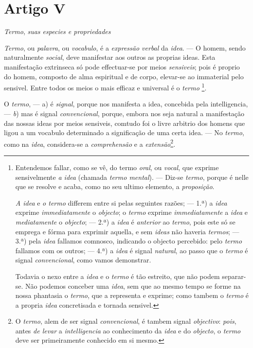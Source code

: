 
\section*{Artigo V}

  \emph{Termo}, \emph{suas especies e propriedades}


\emph{Termo}, ou \emph{palavra}, ou \emph{vocabulo}, é a \emph{expressão verbal} da \emph{idea}. --- O homem, sendo naturalmente \emph{social}, deve manifestar aos outros as proprias ideas. Esta manifestação extrinseca só pode effectuar-se por meios \emph{sensiveis}; pois é proprio do homem, composto de alma espiritual e de corpo, elevar-se ao immaterial pelo sensivel. Entre todos os meios o mais efficaz e universal é o \emph{termo} \footnote{Entendemos fallar, como se vê, do termo \emph{oral}, ou \emph{vocal}, que exprime sensivelmente \emph{a idea} (chamada \emph{termo mental}). --- Diz-se \emph{termo}, porque é nelle que se resolve e acaba, como no seu ultimo elemento, a \emph{proposição}.\par \emph{A idea} e \emph{o termo} differem entre si pelas seguintes razões; --- 1.ª) a \emph{idea} exprime \emph{immediatamente} o \emph{objecto}; o \emph{termo} exprime \emph{immediatamente} a \emph{idea} e \emph{mediatamente} o \emph{objecto}; --- 2.ª) a \emph{idea} é \emph{anterior} ao \emph{termo}, pois este só se emprega e fórma para exprimir aquella, e sem \emph{ideas} não haveria \emph{termos}; --- 3.ª) pela \emph{idea} fallamos comnosco, indicando o objecto percebido: pelo \emph{termo} fallamos com os outros; --- 4.ª) a \emph{idea} é signal \emph{natural}, ao passo que o \emph{termo} é signal \emph{convencional}, como vamos demonstrar.\par Todavia o nexo entre a \emph{idea} e o \emph{termo} é tão estreito, que não podem separar-se. Não podemos conceber uma \emph{idea}, sem que ao mesmo tempo se forme na nossa phantasia o \emph{termo}, que a representa e exprime; como tambem o \emph{termo} é a propria \emph{idea} concretisada e tornada sensivel.}.


O \emph{termo}, --- a) é \emph{signal}, porque nos manifesta a idea, concebida pela intelligencia, --- \emph{b}) mas é signal \emph{convencional}, porque, embora nos seja natural a manifestação das nossas ideas por meios sensiveis, comtudo foi o livre arbitrio dos homens que ligou a um vocabulo determinado a significação de uma certa idea. --- No \emph{termo}, como na \emph{idea}, considera-se a \emph{comprehensão} e a \emph{extensão}\footnote{O \emph{termo}, alem de ser signal \emph{convencional}, é tambem signal \emph{objectivo}: \emph{pois}, antes \emph{de levar} a \emph{intelligencia} ao conhecimento da \emph{idea} e do \emph{objecto}, o \emph{termo} deve ser primeiramente conhecido em si mesmo.}.

